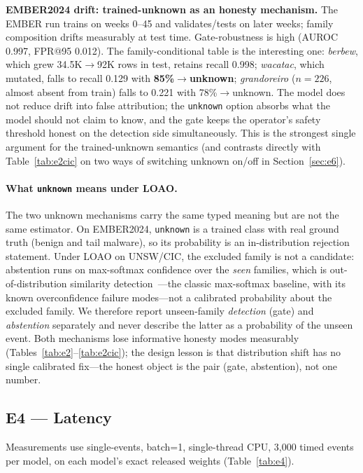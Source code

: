 \documentclass[sigconf,anonymous=false]{acmart}
\begin{document}
\textbf{EMBER2024 drift: trained-unknown as an honesty mechanism.} The EMBER run trains on weeks 0--45 and validates/tests on later weeks; family composition drifts measurably at test time. Gate-robustness is high (AUROC 0.997, FPR@95 0.012). The family-conditional table is the interesting one: \emph{berbew}, which grew 34.5K$\to$92K rows in test, retains recall 0.998; \emph{wacatac}, which mutated, falls to recall 0.129 with \textbf{85\%$\to$unknown}; \emph{grandoreiro} ($n=226$, almost absent from train) falls to 0.221 with 78\%$\to$unknown. The model does not reduce drift into false attribution; the \texttt{unknown} option absorbs what the model should not claim to know, and the gate keeps the operator's safety threshold honest on the detection side simultaneously. This is the strongest single argument for the trained-unknown semantics (and contrasts directly with Table~\ref{tab:e2cic} on two ways of switching unknown on/off in Section~\ref{sec:e6}).

\paragraph{What \texttt{unknown} means under LOAO.} The two unknown mechanisms carry the same typed meaning but are not the same estimator. On EMBER2024, \texttt{unknown} is a trained class with real ground truth (benign and tail malware), so its probability is an in-distribution rejection statement. Under LOAO on UNSW/CIC, the excluded family is not a candidate: abstention runs on max-softmax confidence over the \emph{seen} families, which is out-of-distribution similarity detection~\cite{hendrycks2017}---the classic max-softmax baseline, with its known overconfidence failure modes---not a calibrated probability about the excluded family. We therefore report unseen-family \emph{detection} (gate) and \emph{abstention} separately and never describe the latter as a probability of the unseen event. Both mechanisms lose informative honesty modes measurably (Tables~\ref{tab:e2}--\ref{tab:e2cic}); the design lesson is that distribution shift has no single calibrated fix---the honest object is the pair (gate, abstention), not one number.

\subsection{E4 --- Latency}
\label{sec:e4}

Measurements use single-events, batch=1, single-thread CPU, 3{,}000 timed events per model, on each model's exact released weights (Table~\ref{tab:e4}).
\end{document}

